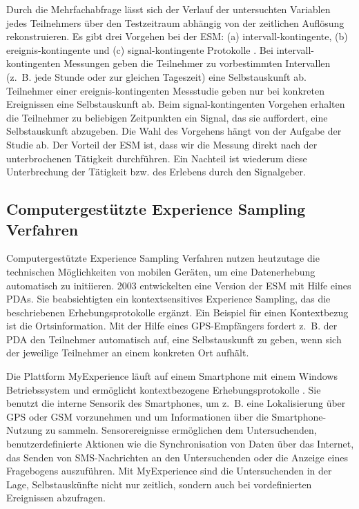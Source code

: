 Durch die Mehrfachabfrage lässt sich der Verlauf der untersuchten Variablen jedes Teilnehmers über den Testzeitraum abhängig von der zeitlichen Auflösung rekonstruieren. Es gibt drei Vorgehen bei der \ac{ESM}: (a) intervall-kontingente, (b) ereignis-kontingente und (c) signal-kontingente Protokolle \citep[][S.~198ff.]{Reis2000}. Bei intervall-kontingenten Messungen geben die Teilnehmer zu vorbestimmten Intervallen (z.~B. jede Stunde oder zur gleichen Tageszeit) eine Selbstauskunft ab. Teilnehmer einer ereignis-kontingenten Messstudie geben nur bei konkreten Ereignissen eine Selbstauskunft ab. Beim signal-kontingenten Vorgehen erhalten die Teilnehmer zu beliebigen Zeitpunkten ein Signal, das sie auffordert, eine Selbstauskunft abzugeben. Die Wahl des Vorgehens hängt von der Aufgabe der Studie ab. Der Vorteil der \ac{ESM} ist, dass wir die Messung direkt nach der unterbrochenen Tätigkeit durchführen. Ein Nachteil ist wiederum diese Unterbrechung der Tätigkeit bzw. des Erlebens durch den Signalgeber.

\subsection{Computergestützte Experience Sampling Verfahren} 

\label{sub:computergestutzte_experience_sampling_verfahren}

Computergestützte Experience Sampling Verfahren nutzen heutzutage die technischen Möglichkeiten von mobilen Geräten, um eine Datenerhebung automatisch zu initiieren. 2003 entwickelten \citet{Intille2003} eine Version der \ac{ESM} mit Hilfe eines \acs{PDA}s. Sie beabsichtigten ein kontextsensitives Experience Sampling, das die beschriebenen Erhebungsprotokolle ergänzt. Ein Beispiel für einen Kontextbezug ist die Ortsinformation. Mit der Hilfe eines \acs{GPS}-Empfängers fordert z.~B. der \acs{PDA} den Teilnehmer automatisch auf, eine Selbstauskunft zu geben, wenn sich der jeweilige Teilnehmer an einem konkreten Ort aufhält.

Die Plattform MyExperience läuft auf einem Smartphone mit einem Windows Betriebssystem und ermöglicht kontextbezogene Erhebungsprotokolle \citep{Froehlich2007}. Sie benutzt die interne Sensorik des Smartphones, um z.~B. eine Lokalisierung über \acs{GPS} oder \acs{GSM} vorzunehmen und um Informationen über die Smartphone-Nutzung zu sammeln. Sensorereignisse ermöglichen dem Untersuchenden, benutzerdefinierte Aktionen wie die Synchronisation von Daten über das Internet, das Senden von \acs{SMS}-Nachrichten an den Untersuchenden oder die Anzeige eines Fragebogens auszuführen. Mit MyExperience sind die Untersuchenden in der Lage, Selbstauskünfte nicht nur zeitlich, sondern auch bei vordefinierten Ereignissen abzufragen.


